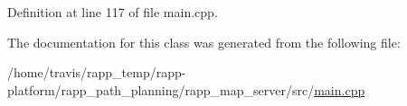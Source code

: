 Definition at line 117 of file main.\-cpp.



The documentation for this class was generated from the following file\-:\begin{DoxyCompactItemize}
\item 
/home/travis/rapp\-\_\-temp/rapp-\/platform/rapp\-\_\-path\-\_\-planning/rapp\-\_\-map\-\_\-server/src/\hyperlink{main_8cpp}{main.\-cpp}\end{DoxyCompactItemize}
